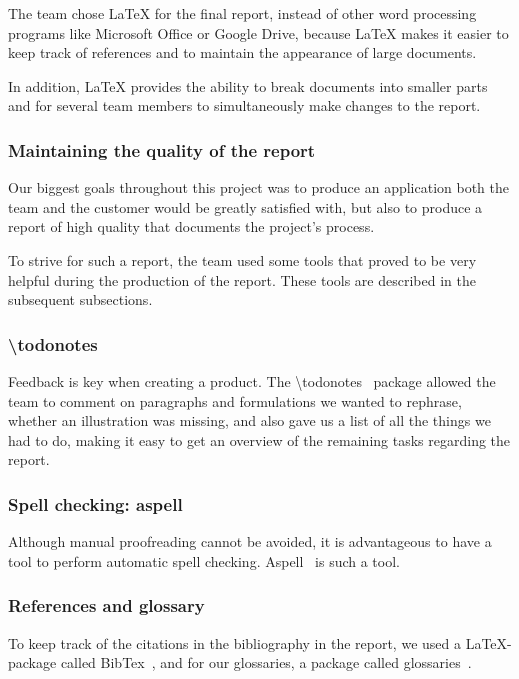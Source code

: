 The team chose LaTeX for the final report, instead of other word processing programs like Microsoft Office or Google Drive, because LaTeX makes it easier to keep track of references and to maintain the appearance of large
documents. 

In addition, LaTeX provides the ability to break documents into smaller parts and for several team members to simultaneously make changes to the report.

\subsubsection{Maintaining the quality of the report}
Our biggest goals throughout this project was to produce an application both the team and the customer would be greatly satisfied with, but also to produce a report of high quality that documents the project's process. 

To strive for such a report, the team used some tools that proved to be very helpful during the production of the report. These tools are described in the subsequent subsections.

\subsubsection{\textbackslash todonotes}
Feedback is key when creating a product. The \textbackslash todonotes~\cite{todo} package allowed the team to comment on paragraphs and formulations we wanted to rephrase, whether an illustration was missing, and also gave us a list of all the things we had to do, making it easy to get an overview of the remaining tasks regarding the report.

\subsubsection{Spell checking: aspell}
Although manual proofreading cannot be avoided, it is advantageous to have a tool to perform automatic spell checking. Aspell~\cite{aspell} is such a tool.

\subsubsection{References and glossary}
To keep track of the citations in the bibliography in the report, we used a LaTeX-package called BibTex~\cite{bibtex}, and for our glossaries, a package called glossaries~\cite{glossaries}.


